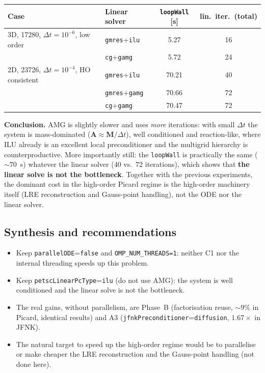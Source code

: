 \documentclass[11pt,a4paper]{article}
\newcommand{\code}[1]{\texttt{\small #1}}
\newcommand{\Mmass}{\mathbf{M}}
\newcommand{\Aimp}{\mathbf{A}}
\newcommand{\dictkey}[1]{\textcolor{black!60!green}{\texttt{\footnotesize #1}}}
\begin{document}
\begin{center}
\begin{tabular}{@{}llcc@{}}
\toprule
Case & Linear solver & \code{loopWall} [s] & lin.\ iter.\ (total) \\
\midrule
3D, \num{17280}, $\Delta t{=}10^{-6}$, low order
   & \code{gmres}+\code{ilu}  & 5.27 & 16 \\
   & \code{cg}+\code{gamg}    & 5.72 & 24 \\
\midrule
2D, \num{23726}, $\Delta t{=}10^{-4}$, HO consistent
   & \code{gmres}+\code{ilu}  & 70.21 & 40 \\
   & \code{gmres}+\code{gamg} & 70.66 & 72 \\
   & \code{cg}+\code{gamg}    & 70.47 & 72 \\
\bottomrule
\end{tabular}
\end{center}

\noindent\textbf{Conclusion.} AMG is slightly slower and uses \emph{more}
iterations: with small $\Delta t$ the system is mass-dominated
($\Aimp\approx\Mmass/\Delta t$), well conditioned and reaction-like, where ILU already
is an excellent local preconditioner and the multigrid hierarchy is
counterproductive. More importantly still: the \code{loopWall} is practically the same
($\sim 70$~s) whatever the linear solver (40 vs.\ 72 iterations), which
shows that \textbf{the linear solve is not the bottleneck}. Together with the
previous experiments, the dominant cost in the high-order Picard regime is the
high-order machinery itself (LRE reconstruction and Gauss-point handling),
not the ODE nor the linear solver.

\subsection{Synthesis and recommendations}
\label{sec:exp-sintesis}

\begin{itemize}[nosep]
  \item Keep \dictkey{parallelODE}=\code{false} and \code{OMP\_NUM\_THREADS=1}:
        neither C1 nor the internal threading speeds up this problem.
  \item Keep \dictkey{petscLinearPcType}=\code{ilu} (do not use AMG): the system
        is well conditioned and the linear solve is not the bottleneck.
  \item The real gains, without parallelism, are Phase~B
        (factorisation reuse, $\sim 9\%$ in Picard, identical
        results) and A3 (\dictkey{jfnkPreconditioner}=\code{diffusion},
        $1.67\times$ in JFNK).
  \item The natural target to speed up the high-order regime would be to parallelise
        or make cheaper the LRE reconstruction and the Gauss-point handling (not
        done here).
\end{itemize}
\end{document}
